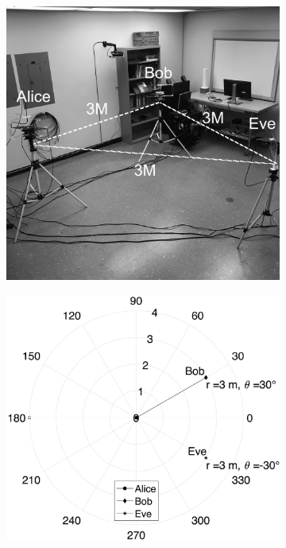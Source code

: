 \begin{figure}[t]
\begin{subfigure}[t]{0.22\textwidth}
\end{subfigure}
\hspace{\fill}
\begin{subfigure}[t]{0.22\textwidth}
\includegraphics[width=\textwidth]{figs/IMG_1668.eps}
\end{subfigure}
\hspace{\fill}
\begin{subfigure}[t]{0.22\textwidth}
\includegraphics[width=\textwidth]{figs/plot.eps}

\end{subfigure}
\end{figure}
